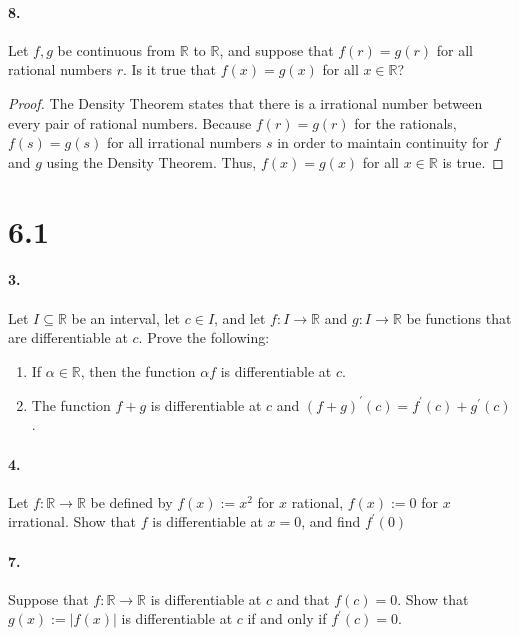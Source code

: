 \documentclass[12pt]{article}
\theoremstyle{remark}
\begin{document}
\paragraph{8.} Let $f, g$ be continuous from $\mathbb{R}$ to $\mathbb{R}$, and suppose that $f(r)=g(r)$ for all rational numbers $r$. Is it true that $f(x)=g(x)$ for all $x \in \mathbb{R}$?
\begin{proof}
    The Density Theorem states that there is a irrational number between every pair of rational numbers. Because $f(r) = g(r)$ for the rationals, $f(s) = g(s)$ for all irrational numbers $s$ in order to maintain continuity for $f$ and $g$ using the Density Theorem. Thus, $f(x) = g(x)$ for all $x \in \mathbb{R}$ is true.
\end{proof}

\section*{6.1}
\paragraph{3.} Let $I \subseteq \mathbb{R}$ be an interval, let $c \in I$, and let $f: I \rightarrow \mathbb{R}$ and $g: I \rightarrow \mathbb{R}$ be functions that are differentiable at $c$. Prove the following:
\begin{enumerate}[label=(\alph*)]
    \item If $\alpha \in \mathbb{R}$, then the function $\alpha f$ is differentiable at $c$.
    \item The function $f + g$ is differentiable at $c$ and $(f + g)^{\prime}(c) = f^{\prime}(c) + g^{\prime}(c)$.
\end{enumerate}

\paragraph{4.} Let $f: \mathbb{R} \rightarrow \mathbb{R}$ be defined by $f(x):=x^2$ for $x$ rational, $f(x):=0$ for $x$ irrational. Show that $f$ is differentiable at $x=0$, and find $f^{\prime}(0)$

\paragraph{7.} Suppose that $f: \mathbb{R} \rightarrow \mathbb{R}$ is differentiable at $c$ and that $f(c)=0$. Show that $g(x):=|f(x)|$ is differentiable at $c$ if and only if $f^{\prime}(c)=0$.
\end{document}
